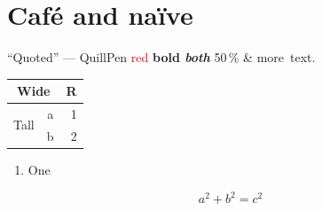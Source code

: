 \documentclass[a4paper,11pt]{article}
\newcommand{\product}{QuillPen}
\begin{document}
\section*{Caf\'e and na\"ive}
``Quoted'' --- \product{} \textcolor{red}{red} {\bfseries bold \itshape both} 50\,\% \& more~text.
\begin{tabular}{|l|c|r|}\hline
\multicolumn{2}{|c|}{Wide} & R \\ \hline
\multirow{2}{*}{Tall} & a & 1 \\
 & b & 2 \\ \hline
\end{tabular}
\begin{enumerate}[label=(\roman*)]
\item One
\end{enumerate}
\begin{equation}a^2+b^2=c^2\end{equation}
\end{document}
